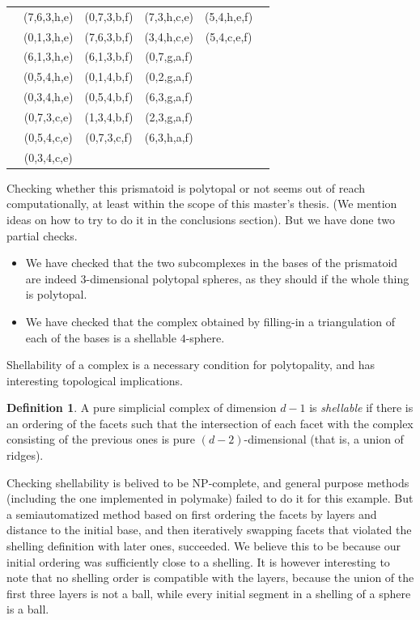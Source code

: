 \documentclass[12pt,a4paper]{article}
\theoremstyle{plain}
\theoremstyle{definition}
\newtheorem{definition}{Definition}
\begin{document}
\begin{tabular} {c|cc|cc|c}
            & (7,6,3,h,e) & (0,7,3,b,f) & (7,3,h,c,e) & (5,4,h,e,f) &             \\
            & (0,1,3,h,e) & (7,6,3,b,f) & (3,4,h,c,e) & (5,4,c,e,f) &             \\
            & (6,1,3,h,e) & (6,1,3,b,f) & (0,7,g,a,f) &             &             \\
            & (0,5,4,h,e) & (0,1,4,b,f) & (0,2,g,a,f) &             &             \\
            & (0,3,4,h,e) & (0,5,4,b,f) & (6,3,g,a,f) &             &             \\
            & (0,7,3,c,e) & (1,3,4,b,f) & (2,3,g,a,f) &             &             \\
            & (0,5,4,c,e) & (0,7,3,c,f) & (6,3,h,a,f) &             &             \\
            & (0,3,4,c,e) &             &             &             &             
\end{tabular}

Checking whether this prismatoid is polytopal or not seems out of reach computationally, at least within the scope of this master's thesis. (We mention ideas on how to try to do it in the conclusions section).  But we have done two partial checks.
\begin{itemize}
\item We have checked that the two subcomplexes in the bases of the prismatoid are indeed $3$-dimensional polytopal spheres, as they should if the whole thing is polytopal.
\item We have checked that the complex obtained by filling-in a triangulation of each of the bases is a shellable $4$-sphere.
\end{itemize}
 

Shellability of a complex is a necessary condition for polytopality, and has interesting topological implications.

\begin{definition}
A pure simplicial complex of dimension $d-1$ is \emph{shellable} if there is an ordering of the facets such that the intersection of each facet with the complex consisting of the previous ones is pure $(d-2)$-dimensional (that is, a union of ridges).
\end{definition}

Checking shellability is belived to be NP-complete, and general purpose methods (including the one implemented in polymake) failed to do it for this example. But a semiautomatized  method based on first ordering the facets by layers and distance to the initial base, and then iteratively swapping facets that violated the shelling definition with later ones, succeeded. We believe this to be because our initial ordering was sufficiently close to a shelling. It is however interesting to note that no shelling order is compatible with the layers, because the union of the first three layers is not a ball, while every initial segment in a shelling of a sphere is a ball.
\end{document}
